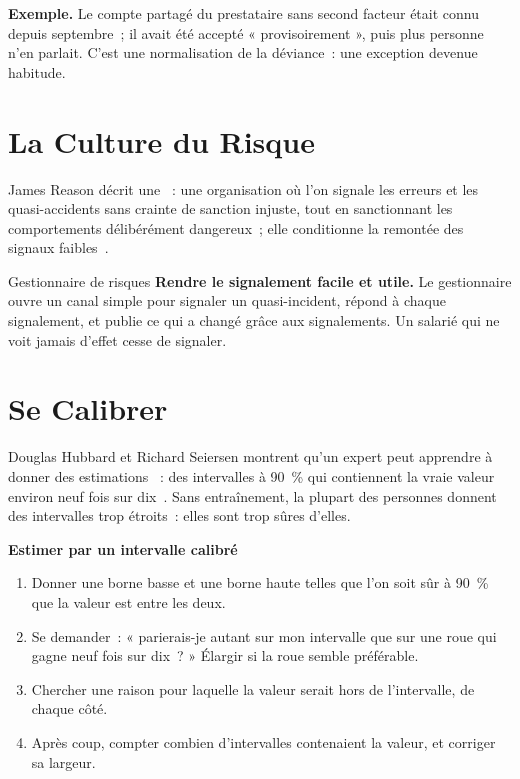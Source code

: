 \textbf{Exemple.} Le compte partagé du prestataire sans second facteur
était connu depuis septembre~; il avait été accepté « provisoirement »,
puis plus personne n'en parlait. C'est une normalisation de la déviance~:
une exception devenue habitude.

\section{La Culture du Risque}
\label{sec:c02-culture}

James Reason décrit une ~: une organisation où l'on
signale les erreurs et les quasi-accidents sans crainte de sanction
injuste, tout en sanctionnant les comportements délibérément dangereux~;
elle conditionne la remontée des signaux faibles~\cite{reason1997}.

\begin{boxmetier}{Gestionnaire de risques}
\textbf{Rendre le signalement facile et utile.} Le gestionnaire ouvre un
canal simple pour signaler un quasi-incident, répond à chaque signalement,
et publie ce qui a changé grâce aux signalements. Un salarié qui ne voit
jamais d'effet cesse de signaler.
\end{boxmetier}

\section{Se Calibrer}
\label{sec:c02-calibrer}

Douglas Hubbard et Richard Seiersen montrent qu'un expert peut apprendre à
donner des estimations ~: des intervalles à 90~\% qui
contiennent la vraie valeur environ neuf fois sur dix~\cite{hubbard2016cyber}.
Sans entraînement, la plupart des personnes donnent des intervalles trop
étroits~: elles sont trop sûres d'elles.

\begin{boxprocedure}
\textbf{Estimer par un intervalle calibré}
\begin{enumerate}
    \item Donner une borne basse et une borne haute telles que l'on soit
          sûr à 90~\% que la valeur est entre les deux.
    \item Se demander~: « parierais-je autant sur mon intervalle que sur
          une roue qui gagne neuf fois sur dix~? » Élargir si la roue
          semble préférable.
    \item Chercher une raison pour laquelle la valeur serait hors de
          l'intervalle, de chaque côté.
    \item Après coup, compter combien d'intervalles contenaient la valeur,
          et corriger sa largeur.
\end{enumerate}
\end{boxprocedure}

